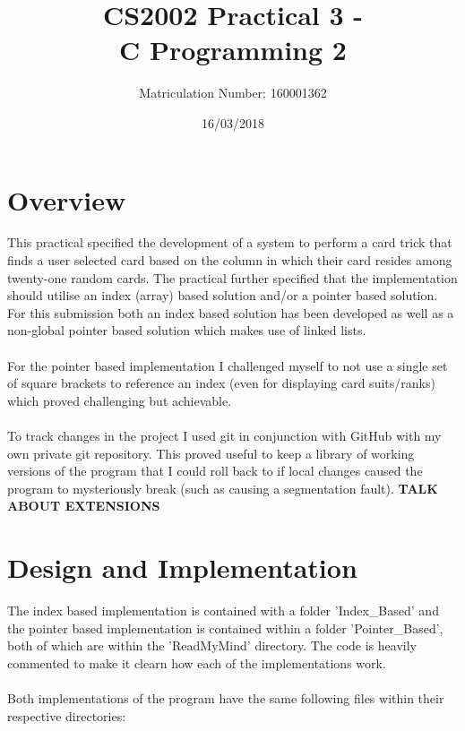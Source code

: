 \documentclass[11]{article}
\title{CS2002 Practical 3 - \\C Programming 2}
\date{16/03/2018}
\author{Matriculation Number: 160001362}
\begin{document}
	
	\maketitle
	\newpage
	\tableofcontents
	
	\newpage
	\section{Overview}
	This practical specified the development of a system to perform a card trick that finds a user selected card based on the column in which their card resides among twenty-one random cards. The practical further specified that the implementation should utilise an index (array) based solution and/or a pointer based solution. For this submission both an index based solution has been developed as well as a non-global pointer based solution which makes use of linked lists. \\\\For the pointer based implementation I challenged myself to not use a single set of square brackets to reference an index (even for displaying card suits/ranks) which proved challenging but achievable. \\\\ To track changes in the project I used git in conjunction with GitHub with my own private git repository. This proved useful to keep a library of working versions of the program that I could roll back to if local changes caused the program to mysteriously break (such as causing a segmentation fault). \textbf{TALK ABOUT EXTENSIONS}
	\section{Design and Implementation}
		The index based implementation is contained with a folder 'Index\_Based' and the pointer based implementation is contained within a folder 'Pointer\_Based', both of which are within the 'ReadMyMind' directory. The code is heavily commented to make it clearn how each of the implementations work. \\\\Both implementations of the program have the same following files within their respective directories:
\end{document}
